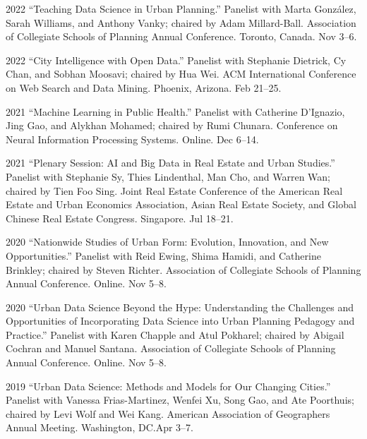 \documentclass[11pt,letterpaper]{report}
\begin{document}
    \begin{tablist}

        \item[2022] \tab{}\enquote{Teaching Data Science in Urban Planning.} Panelist with Marta Gonz{\'a}lez, Sarah Williams, and Anthony Vanky; chaired by Adam Millard-Ball. Association of Collegiate Schools of Planning Annual Conference. Toronto, Canada. Nov 3--6.

        \item[2022] \tab{}\enquote{City Intelligence with Open Data.} Panelist with Stephanie Dietrick, Cy Chan, and Sobhan Moosavi; chaired by Hua Wei. ACM International Conference on Web Search and Data Mining. Phoenix, Arizona. Feb 21--25.

        \item[2021] \tab{}\enquote{Machine Learning in Public Health.} Panelist with Catherine D'Ignazio, Jing Gao, and Alykhan Mohamed; chaired by Rumi Chunara. Conference on Neural Information Processing Systems. Online. Dec 6--14.

        \item[2021] \tab{}\enquote{Plenary Session: AI and Big Data in Real Estate and Urban Studies.} Panelist with Stephanie Sy, Thies Lindenthal, Man Cho, and Warren Wan; chaired by Tien Foo Sing. Joint Real Estate Conference of the American Real Estate and Urban Economics Association, Asian Real Estate Society, and Global Chinese Real Estate Congress. Singapore. Jul 18--21.

        \item[2020] \tab{}\enquote{Nationwide Studies of Urban Form: Evolution, Innovation, and New Opportunities.} Panelist with Reid Ewing, Shima Hamidi, and Catherine Brinkley; chaired by Steven Richter. Association of Collegiate Schools of Planning Annual Conference. Online. Nov 5--8.

        \item[2020] \tab{}\enquote{Urban Data Science Beyond the Hype: Understanding the Challenges and Opportunities of Incorporating Data Science into Urban Planning Pedagogy and Practice.} Panelist with Karen Chapple and Atul Pokharel; chaired by Abigail Cochran and Manuel Santana. Association of Collegiate Schools of Planning Annual Conference. Online. Nov 5--8.

        \item[2019] \tab{}\enquote{Urban Data Science: Methods and Models for Our Changing Cities.} Panelist with Vanessa Frias-Martinez, Wenfei Xu, Song Gao, and Ate Poorthuis; chaired by Levi Wolf and Wei Kang. American Association of Geographers Annual Meeting. Washington, DC.\@ Apr 3--7.


\end{tablist}
\end{document}
